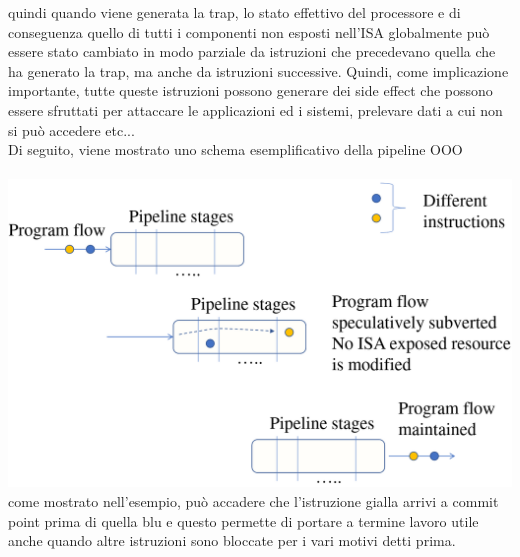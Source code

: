 \documentclass[14pt, oneside]{book}
\begin{document}
quindi quando viene generata la trap, lo stato effettivo del processore e di conseguenza quello di tutti i componenti non esposti nell'ISA globalmente può essere stato cambiato in modo parziale da istruzioni che precedevano quella che ha generato la trap, ma anche da istruzioni successive. Quindi, come implicazione importante, tutte queste istruzioni possono generare dei side effect che possono essere sfruttati per attaccare le applicazioni ed i sistemi, prelevare dati a cui non si può accedere etc...\\ Di seguito, viene mostrato uno schema esemplificativo della pipeline OOO\\\\
\includegraphics[scale=0.2]{immagini/pipeline-ooo}\\
come mostrato nell'esempio, può accadere che l'istruzione gialla arrivi a commit point prima  di quella blu e questo permette di portare a termine lavoro utile anche quando altre istruzioni sono bloccate per i vari motivi detti prima.
\end{document}
